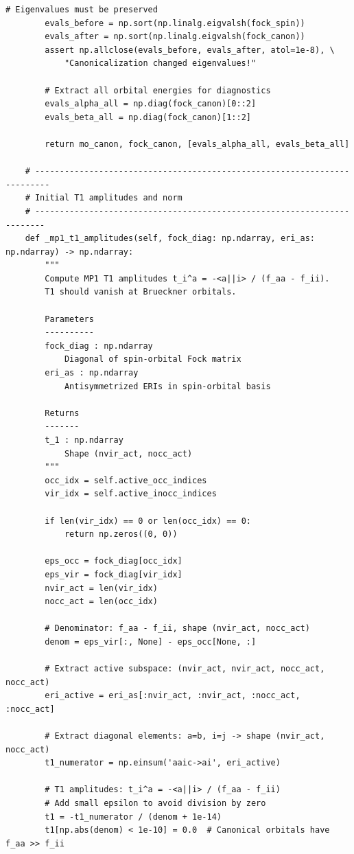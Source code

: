 \begin{lstlisting}[style=python, caption={...}, label=lst:full_code]
        # Eigenvalues must be preserved
        evals_before = np.sort(np.linalg.eigvalsh(fock_spin))
        evals_after = np.sort(np.linalg.eigvalsh(fock_canon))
        assert np.allclose(evals_before, evals_after, atol=1e-8), \
            "Canonicalization changed eigenvalues!"
        
        # Extract all orbital energies for diagnostics
        evals_alpha_all = np.diag(fock_canon)[0::2]
        evals_beta_all = np.diag(fock_canon)[1::2]
        
        return mo_canon, fock_canon, [evals_alpha_all, evals_beta_all]

    # -------------------------------------------------------------------------
    # Initial T1 amplitudes and norm
    # ------------------------------------------------------------------------
    def _mp1_t1_amplitudes(self, fock_diag: np.ndarray, eri_as: np.ndarray) -> np.ndarray:
        """
        Compute MP1 T1 amplitudes t_i^a = -<a||i> / (f_aa - f_ii).
        T1 should vanish at Brueckner orbitals.
        
        Parameters
        ----------
        fock_diag : np.ndarray
            Diagonal of spin-orbital Fock matrix
        eri_as : np.ndarray
            Antisymmetrized ERIs in spin-orbital basis
        
        Returns
        -------
        t_1 : np.ndarray
            Shape (nvir_act, nocc_act)
        """
        occ_idx = self.active_occ_indices
        vir_idx = self.active_inocc_indices
        
        if len(vir_idx) == 0 or len(occ_idx) == 0:
            return np.zeros((0, 0))
        
        eps_occ = fock_diag[occ_idx]
        eps_vir = fock_diag[vir_idx]
        nvir_act = len(vir_idx)
        nocc_act = len(occ_idx)
        
        # Denominator: f_aa - f_ii, shape (nvir_act, nocc_act)
        denom = eps_vir[:, None] - eps_occ[None, :]
        
        # Extract active subspace: (nvir_act, nvir_act, nocc_act, nocc_act)
        eri_active = eri_as[:nvir_act, :nvir_act, :nocc_act, :nocc_act]
        
        # Extract diagonal elements: a=b, i=j -> shape (nvir_act, nocc_act)
        t1_numerator = np.einsum('aaic->ai', eri_active)
        
        # T1 amplitudes: t_i^a = -<a||i> / (f_aa - f_ii)
        # Add small epsilon to avoid division by zero
        t1 = -t1_numerator / (denom + 1e-14)
        t1[np.abs(denom) < 1e-10] = 0.0  # Canonical orbitals have f_aa >> f_ii
        

\end{lstlisting}

